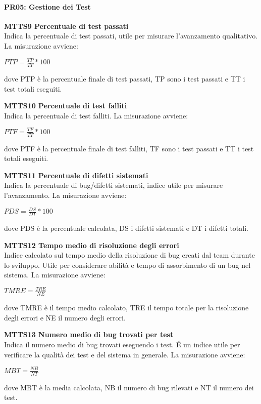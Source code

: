 \paragraph{PR05: Gestione dei Test}
\begin{itemize}

	\item \textbf{MTTS9 Percentuale di test passati}\-\\
Indica la percentuale di test passati, utile per misurare l'avanzamento qualitativo. La misurazione avviene:
\begin{center}
	\item $PTP = \frac{TP}{TT}*100$
\end{center}
dove PTP è la percentuale finale di test passati, TP sono i test passati e TT i test totali eseguiti.

	\item \textbf{MTTS10 Percentuale di test falliti}\-\\
Indica la percentuale di test falliti. La misurazione avviene:
\begin{center}
	\item $PTF = \frac{TF}{TT}*100$
\end{center}
dove PTF è la percentuale finale di test falliti, TF sono i test passati e TT i test totali eseguiti.

	\item \textbf{MTTS11 Percentuale di difetti sistemati}\-\\
Indica la percentuale di bug/difetti sistemati, indice utile per misurare l'avanzamento. La misurazione avviene:
\begin{center}
	\item $PDS = \frac{DS}{DT}*100$
\end{center}
dove PDS è la percentuale calcolata, DS i difetti sistemati e DT i difetti totali.

	\item \textbf{MTTS12 Tempo medio di risoluzione degli errori}\-\\
Indice calcolato sul tempo medio della risoluzione di bug creati dal team durante lo sviluppo. Utile per considerare abilità e tempo di assorbimento di un bug nel sistema. La misurazione avviene:
\begin{center}
	\item $TMRE = \frac{TRE}{NE}$
\end{center}
dove TMRE è il tempo medio calcolato, TRE il tempo totale per la risoluzione degli errori e NE il numero degli errori.

	\item \textbf{MTTS13 Numero medio di bug trovati per test}\-\\
Indica il numero medio di bug trovati eseguendo i test. \'E un indice utile per verificare la qualità dei test e del sistema in generale. La misurazione avviene:
\begin{center}
	\item $MBT = \frac{NB}{NT}$
\end{center}
dove MBT è la media calcolata, NB il numero di bug rilevati e NT il numero dei test.

\end{itemize}

